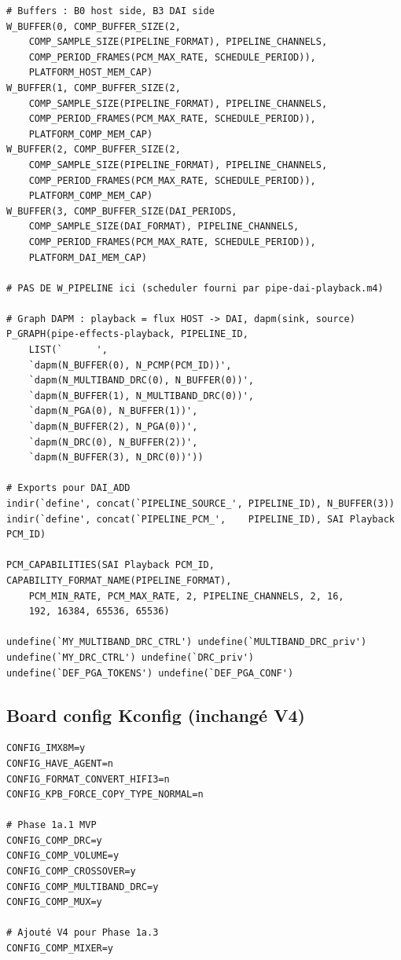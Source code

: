 \documentclass[11pt,a4paper]{article}
\begin{document}
\begin{lstlisting}[language={}, basicstyle=\ttfamily\scriptsize]
# Buffers : B0 host side, B3 DAI side
W_BUFFER(0, COMP_BUFFER_SIZE(2,
    COMP_SAMPLE_SIZE(PIPELINE_FORMAT), PIPELINE_CHANNELS,
    COMP_PERIOD_FRAMES(PCM_MAX_RATE, SCHEDULE_PERIOD)),
    PLATFORM_HOST_MEM_CAP)
W_BUFFER(1, COMP_BUFFER_SIZE(2,
    COMP_SAMPLE_SIZE(PIPELINE_FORMAT), PIPELINE_CHANNELS,
    COMP_PERIOD_FRAMES(PCM_MAX_RATE, SCHEDULE_PERIOD)),
    PLATFORM_COMP_MEM_CAP)
W_BUFFER(2, COMP_BUFFER_SIZE(2,
    COMP_SAMPLE_SIZE(PIPELINE_FORMAT), PIPELINE_CHANNELS,
    COMP_PERIOD_FRAMES(PCM_MAX_RATE, SCHEDULE_PERIOD)),
    PLATFORM_COMP_MEM_CAP)
W_BUFFER(3, COMP_BUFFER_SIZE(DAI_PERIODS,
    COMP_SAMPLE_SIZE(DAI_FORMAT), PIPELINE_CHANNELS,
    COMP_PERIOD_FRAMES(PCM_MAX_RATE, SCHEDULE_PERIOD)),
    PLATFORM_DAI_MEM_CAP)

# PAS DE W_PIPELINE ici (scheduler fourni par pipe-dai-playback.m4)

# Graph DAPM : playback = flux HOST -> DAI, dapm(sink, source)
P_GRAPH(pipe-effects-playback, PIPELINE_ID,
    LIST(`      ',
    `dapm(N_BUFFER(0), N_PCMP(PCM_ID))',
    `dapm(N_MULTIBAND_DRC(0), N_BUFFER(0))',
    `dapm(N_BUFFER(1), N_MULTIBAND_DRC(0))',
    `dapm(N_PGA(0), N_BUFFER(1))',
    `dapm(N_BUFFER(2), N_PGA(0))',
    `dapm(N_DRC(0), N_BUFFER(2))',
    `dapm(N_BUFFER(3), N_DRC(0))'))

# Exports pour DAI_ADD
indir(`define', concat(`PIPELINE_SOURCE_', PIPELINE_ID), N_BUFFER(3))
indir(`define', concat(`PIPELINE_PCM_',    PIPELINE_ID), SAI Playback PCM_ID)

PCM_CAPABILITIES(SAI Playback PCM_ID, CAPABILITY_FORMAT_NAME(PIPELINE_FORMAT),
    PCM_MIN_RATE, PCM_MAX_RATE, 2, PIPELINE_CHANNELS, 2, 16,
    192, 16384, 65536, 65536)

undefine(`MY_MULTIBAND_DRC_CTRL') undefine(`MULTIBAND_DRC_priv')
undefine(`MY_DRC_CTRL') undefine(`DRC_priv')
undefine(`DEF_PGA_TOKENS') undefine(`DEF_PGA_CONF')
\end{lstlisting}

\subsection{Board config Kconfig (inchangé V4)}

\begin{lstlisting}[language={}, basicstyle=\ttfamily\scriptsize]
CONFIG_IMX8M=y
CONFIG_HAVE_AGENT=n
CONFIG_FORMAT_CONVERT_HIFI3=n
CONFIG_KPB_FORCE_COPY_TYPE_NORMAL=n

# Phase 1a.1 MVP
CONFIG_COMP_DRC=y
CONFIG_COMP_VOLUME=y
CONFIG_COMP_CROSSOVER=y
CONFIG_COMP_MULTIBAND_DRC=y
CONFIG_COMP_MUX=y

# Ajouté V4 pour Phase 1a.3
CONFIG_COMP_MIXER=y
\end{lstlisting}
\end{document}
